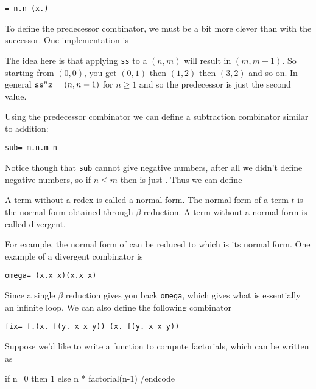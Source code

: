 \smallskip
\centerline{\tt\iszro = \lambda n.n (\lambda x.\fls) \tru}

To define the predecessor combinator, we must be a bit more clever than with the successor.
One implementation is

\smallskip
\centerline{\vbox{}}

The idea here is that applying {\tt ss} to a $(n,m)$ will result in $(m,m+1)$.
So starting from $(0,0)$, you get $(0,1)$ then $(1,2)$ then $(3,2)$ and so on.
In general ${\tt ss}^n{\tt z}=(n,n-1)$ for $n\geq1$ and so the predecessor is just the second value.

Using the predecessor combinator we can define a subtraction combinator similar to addition:

\smallskip
\centerline{\tt sub= \lambda m.\lambda n.m \prd n}

Notice though that {\tt sub} cannot give negative numbers, after all we didn't define negative numbers, so if $n\leq m$ then  is just .
Thus we can define

\smallskip
{}

\bdefn

    A term without a redex is called a {\emphcolor normal form}.
    The normal form of a term $t$ is the normal form obtained through $\beta$ reduction.
    A term without a normal form is called {\emphcolor divergent}.

\edefn

For example, the normal form of  can be reduced to  which is its normal form.
One example of a divergent combinator is

\smallskip
\centerline{\tt omega= (\lambda x.x x)(\lambda x.x x)}

Since a single $\beta$ reduction gives you back {\tt omega}, which gives what is essentially an infinite loop.
We can also define the following combinator

\smallskip
\centerline{\tt fix= \lambda f.(\lambda x. f(\lambda y. x x y)) (\lambda x. f(\lambda y. x x y))}

Suppose we'd like to write a function to compute factorials, which can be written as

\begincode
if n=0 then 1
else n * factorial(n-1)
/endcode

